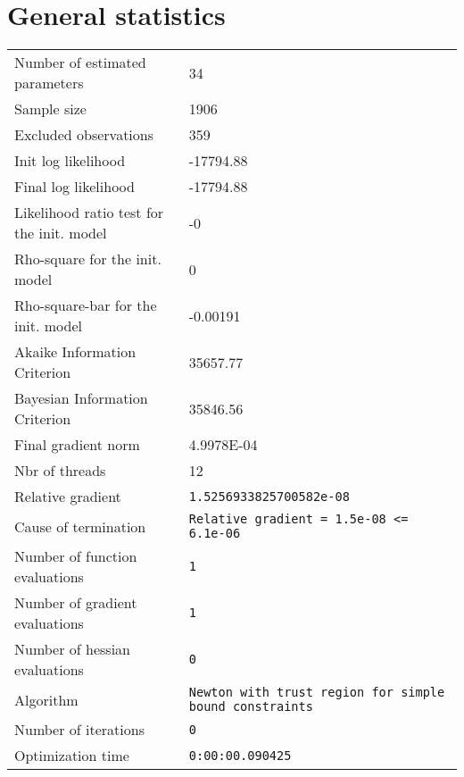 



\section{General statistics}
\begin{tabular}{ll}
Number of estimated parameters & 34 \\
Sample size & 1906 \\
Excluded observations & 359 \\
Init log likelihood & -17794.88 \\
Final log likelihood & -17794.88 \\
Likelihood ratio test for the init. model & -0 \\
Rho-square for the init. model & 0 \\
Rho-square-bar for the init. model & -0.00191 \\
Akaike Information Criterion & 35657.77 \\
Bayesian Information Criterion & 35846.56 \\
Final gradient norm & 4.9978E-04 \\
Nbr of threads & 12 \\
Relative gradient & \verb$1.5256933825700582e-08$ \\
Cause of termination & \verb$Relative gradient = 1.5e-08 <= 6.1e-06$ \\
Number of function evaluations & \verb$1$ \\
Number of gradient evaluations & \verb$1$ \\
Number of hessian evaluations & \verb$0$ \\
Algorithm & \verb$Newton with trust region for simple bound constraints$ \\
Number of iterations & \verb$0$ \\
Optimization time & \verb$0:00:00.090425$ \\
\end{tabular}

